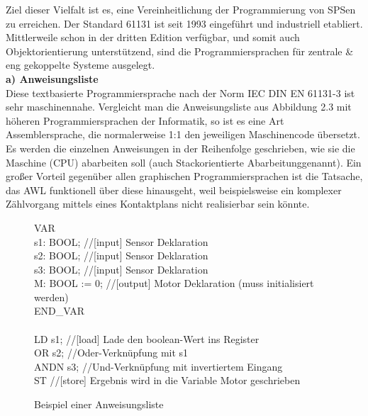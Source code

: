 	Ziel dieser Vielfalt ist es, eine Vereinheitlichung der Programmierung von SPSen zu erreichen. Der Standard 61131 ist seit 1993 eingeführt und industriell etabliert. Mittlerweile schon in der dritten Edition verfügbar, und somit auch Objektorientierung unterstützend, sind die Programmiersprachen für zentrale \& eng gekoppelte Systeme ausgelegt.\\
	
	\textbf{a) Anweisungsliste}\\
	
	Diese textbasierte Programmiersprache nach der Norm IEC DIN EN 61131-3 ist sehr maschinennahe. Vergleicht man die Anweisungsliste aus Abbildung 2.3 mit höheren Programmiersprachen der Informatik, so ist es eine Art Assemblersprache, die normalerweise 1:1 den jeweiligen Maschinencode übersetzt. Es werden die einzelnen Anweisungen in der Reihenfolge geschrieben, wie sie die Maschine (CPU) abarbeiten soll (auch \glqq Stackorientierte Abarbeitung\grqq \space genannt). Ein großer Vorteil gegenüber allen graphischen Programmiersprachen ist die Tatsache, das AWL funktionell über diese hinausgeht, weil beispielsweise ein komplexer Zählvorgang mittels eines Kontaktplans nicht realisierbar sein könnte.	\cite{spslehrgang_struktur, egroetsch_sps}\\

	\begin{figure}[h!]
		\begin{framed}
			VAR\\
			s1: BOOL; \color{gray}//[input] Sensor Deklaration\\ \color{black}
			s2: BOOL; \color{gray}//[input] Sensor Deklaration\\ \color{black}
			s3: BOOL; \color{gray}//[input] Sensor Deklaration\\ \color{black}
			M: BOOL := 0; \color{gray}//[output] Motor Deklaration (muss initialisiert werden)\\ \color{black}
			END\_VAR\\\\
			LD s1; \color{gray}//[load] Lade den boolean-Wert ins Register\\ \color{black}
			OR s2; \color{gray}//Oder-Verknüpfung mit s1\\ \color{black}
			ANDN s3; \color{gray}//Und-Verknüpfung mit invertiertem Eingang\\ \color{black}
			ST \color{gray}//[store] Ergebnis wird in die Variable Motor geschrieben\\
		\end{framed}
		\caption{Beispiel einer Anweisungsliste}
	\end{figure}
	
